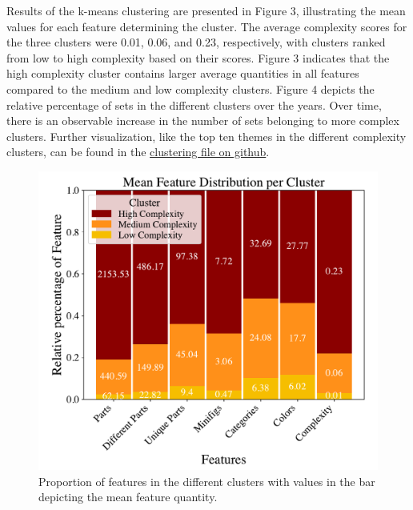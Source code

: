\documentclass{article}
\theoremstyle{plain}
\theoremstyle{definition}
\theoremstyle{remark}
\begin{document}
Results of the k-means clustering are presented in Figure 3, illustrating the mean values for each feature determining the cluster. The average complexity scores for the three clusters were 0.01, 0.06, and 0.23, respectively, with clusters ranked from low to high complexity based on their scores. Figure 3 indicates that the high complexity cluster contains larger average quantities in all features compared to the medium and low complexity clusters. Figure 4 depicts the relative percentage of sets in the different clusters over the years. Over time, there is an observable increase in the number of sets belonging to more complex clusters. Further visualization, like the top ten themes in the different complexity clusters, can be found in the \href{https://github.com/eddiebeach99/Data_Literacy/blob/main/Analysis/clustering.ipynb}{clustering file on github}.
\begin{figure}[H]
 \vskip 0.2in
 \begin{center}
 \centerline{\includegraphics[width=\columnwidth]{../Images/Clusters_features.pdf}}
\caption{Proportion of features in the different clusters with values in the bar depicting the mean feature quantity.}
\label{icml-historical}
 \end{center}
 \vskip -0.2in
\end{figure}
\end{document}
